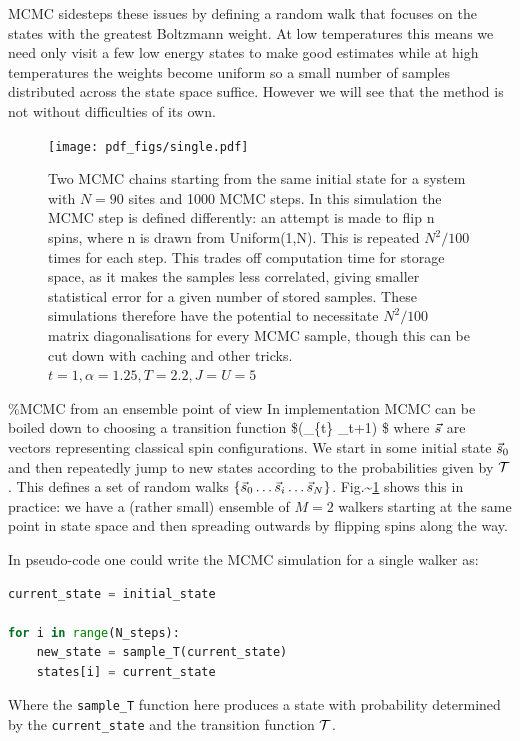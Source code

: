 \ac{MCMC} sidesteps these issues by defining a random walk that focuses
on the states with the greatest Boltzmann weight. At low temperatures
this means we need only visit a few low energy states to make good
estimates while at high temperatures the weights become uniform so a
small number of samples distributed across the state space suffice.
However we will see that the method is not without difficulties of its
own.

\begin{figure}
  \centering
  \texttt{[image: pdf\_figs/single.pdf]}
  \caption{Two MCMC chains starting from the same initial state for a system with $N = 90$ sites and 1000 MCMC steps.  In this simulation the MCMC step is defined differently: an attempt is made to flip n spins, where n is drawn from Uniform(1,N). This is repeated $N^2/100$ times for each step. This trades off computation time for storage space, as it makes the samples less correlated, giving smaller statistical error for a given number of stored samples. These simulations therefore have the potential to necessitate $N^2/100$ matrix diagonalisations for every MCMC sample, though this can be cut down with caching and other tricks. $t = 1, \alpha = 1.25, T = 2.2, J = U = 5 $ \label{fig:single}}
\end{figure}

\%MCMC from an ensemble point of view In implementation \ac{MCMC} can be
boiled down to choosing a transition function \$\T(\s\_\{t\}
\rightarrow \s\_t+1) \$ where \(\vec{s}\) are vectors representing classical
spin configurations. We start in some initial state \(\vec{s}_0\) and then
repeatedly jump to new states according to the probabilities given by
\(\mathcal{T}\). This defines a set of random walks
\(\{\vec{s}_0\ldots \vec{s}_i\ldots \vec{s}_N\}\).
Fig.\textasciitilde{}\ref{fig:single} shows this in practice: we have a
(rather small) ensemble of \(M = 2\) walkers starting at the same point
in state space and then spreading outwards by flipping spins along the
way.

In pseudo-code one could write the MCMC simulation for a single walker
as:

\begin{lstlisting}[language=Python]
current_state = initial_state

for i in range(N_steps):
    new_state = sample_T(current_state) 
    states[i] = current_state
\end{lstlisting}

Where the \texttt{sample\_T} function here produces a state with
probability determined by the \texttt{current\_state} and the transition
function \(\mathcal{T}\).

